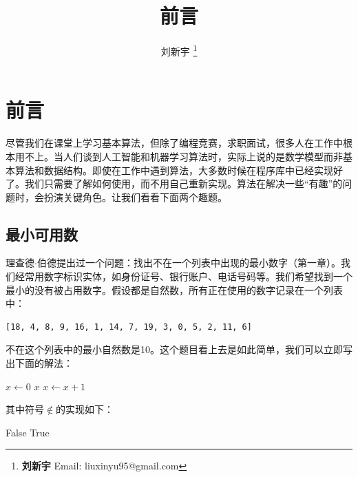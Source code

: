 \documentclass[b5paper]{ctexart}
\begin{document}
\title{前言}

\author{刘新宇
\thanks{{\bfseries 刘新宇} \newline
  Email: liuxinyu95@gmail.com \newline}
  }

\maketitle
\fi


\chapter*{前言}

尽管我们在课堂上学习基本算法，但除了编程竞赛，求职面试，很多人在工作中根本用不上。当人们谈到人工智能和机器学习算法时，实际上说的是数学模型而非基本算法和数据结构。即使在工作中遇到算法，大多数时候在程序库中已经实现好了。我们只需要了解如何使用，而不用自己重新实现。算法在解决一些“有趣”的问题时，会扮演关键角色。让我们看看下面两个趣题。

\section*{最小可用数}
\label{min-free} 

理查德$\cdot$伯德提出过一个问题：找出不在一个列表中出现的最小数字（\cite{fp-pearls}第一章）。我们经常用数字标识实体，如身份证号、银行账户、电话号码等。我们希望找到一个最小的没有被占用数字。假设都是自然数，所有正在使用的数字记录在一个列表中：

\begin{Verbatim}[fontsize=\footnotesize]
[18, 4, 8, 9, 16, 1, 14, 7, 19, 3, 0, 5, 2, 11, 6]
\end{Verbatim}

不在这个列表中的最小自然数是10。这个题目看上去是如此简单，我们可以立即写出下面的解法：

\begin{algorithmic}[1]
  \State $x \gets 0$
  \Loop
      \State \Return $x$
    \Else
      \State $x \gets x + 1$
    \EndIf
  \EndLoop
\EndFunction
\end{algorithmic}

其中符号$\notin$的实现如下：

\begin{algorithmic}[1]
      \State \Return False
    \EndIf
  \EndFor
  \State \Return True
\EndFunction
\end{algorithmic}
\end{document}
